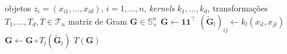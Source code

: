 \begin{algorithm}[htbp]
\caption{\textit{Pipeline} núcleo-transformação}
\label{alg:pipeline}
\begin{algorithmic}[1]
\Require objetos $z_i = (x_{i1},\dots,x_{id})$, $i = 1,\dots,n$, \textit{kernels} $k_1,\dots,k_d$, transformações $T_1,\dots,T_d, T \in \mathcal{T}_n$
\Ensure matriz de Gram $\mathbf{G} \in \mathbb{S}_+^n$
\State $\mathbf{G} \gets \mathbf{1}\mathbf{1}^\top$
        \State $(\widetilde{\mathbf{G}}_l)_{ij} \gets k_l(x_{il}, x_{jl})$ 
    \EndFor
    \State $\mathbf{G} \gets \mathbf{G} \circ T_l(\widetilde{\mathbf{G}}_l)$ 
\EndFor
\State \Return $T(\mathbf{G})$
\end{algorithmic}
\end{algorithm}